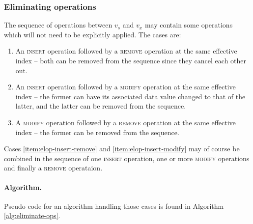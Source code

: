 \subsubsection{Eliminating operations}
The sequence of operations between $v_s$ and $v_x$ may contain some operations
which will not need to be explicitly applied. The cases are:
\begin{enumerate}
  \item An \textsc{insert} operation followed by a \textsc{remove} operation at
  the same effective index -- both can be removed from the sequence since they
  cancel each other out.
  \label{item:elop-insert-remove}

  \item An \textsc{insert} operation followed by a \textsc{modify} operation at
  the same effective index -- the former can have its associated data value
  changed to that of the latter, and the latter can be removed from the
  sequence.
  \label{item:elop-insert-modify}

  \item A \textsc{modify} operation followed by a \textsc{remove} operation at
  the same effective index -- the former can be removed from the sequence.
  \label{item:elop-modify-remove}
\end{enumerate}

Cases \ref{item:elop-insert-remove} and \ref{item:elop-insert-modify} may of
course be combined in the sequence of one \textsc{insert} operation, one or more
\textsc{modify} operations and finally a \textsc{remove} operataion.


\paragraph{Algorithm.}
Pseudo code for an algorithm handling those cases is found in Algorithm
\ref{alg:eliminate-ops}.

